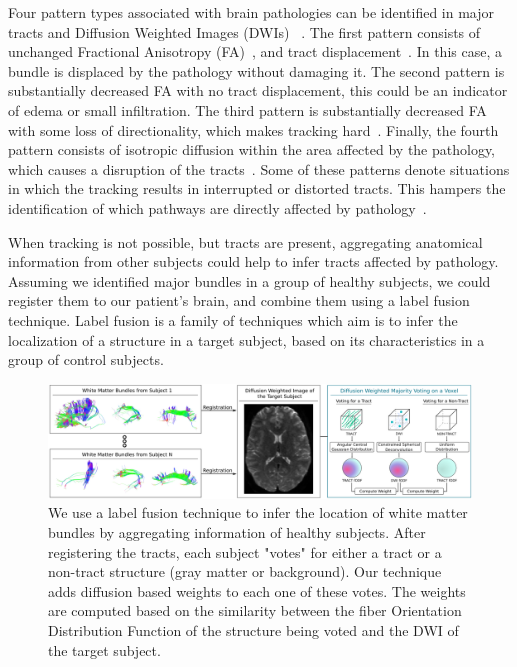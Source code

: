 Four pattern types associated with brain pathologies can be identified in major
tracts and Diffusion Weighted Images (DWIs) ~\cite{Pictorial2004}. The first
pattern consists of unchanged Fractional Anisotropy (FA)~\cite{Basser1996}, and
tract displacement~\cite{Pictorial2004}. In this case, a
bundle is displaced by the pathology without damaging it. The second pattern
is substantially decreased FA with no tract displacement, this could be
an indicator of edema or small infiltration\cite{Schonberg2006, Huisman2009}.
The third pattern is substantially decreased FA with some loss of directionality,
which makes tracking hard~\cite{Schonberg2006, Pictorial2004}. Finally,
the fourth pattern consists of isotropic diffusion within the area affected by
the pathology, which causes a disruption of the tracts~\cite{Pictorial2004}.
Some of these patterns denote situations in which the tracking results in
interrupted or distorted tracts. This hampers the identification of which pathways
are directly affected by pathology~\cite{Pictorial2004}.

When tracking is not possible, but tracts are present, aggregating anatomical
information from other subjects could help to infer tracts affected by pathology.
Assuming we identified major bundles in a group of healthy subjects, we could
register them to our patient’s brain, and combine them using a label fusion
technique. Label fusion is a family of techniques which aim is to infer the
localization of a structure in a target subject, based on its characteristics
in a group of control subjects\cite{Asman2013}. 

\begin{figure}[t]
    \includegraphics[width=\textwidth]{7.multiatlas/img/diagram.png}
    \caption{We use a label fusion technique to infer the location of white
             matter bundles by aggregating information of healthy subjects.
             After registering the tracts, each subject "votes" for either
             a tract or a non-tract structure (gray matter or background).
             Our technique adds diffusion based weights to each one of these votes.
             The weights are computed based on the similarity between the fiber
             Orientation Distribution Function of the structure being voted
             and the DWI of the target subject.}
    \label{fig:weighted_diffusion}
\end{figure}

